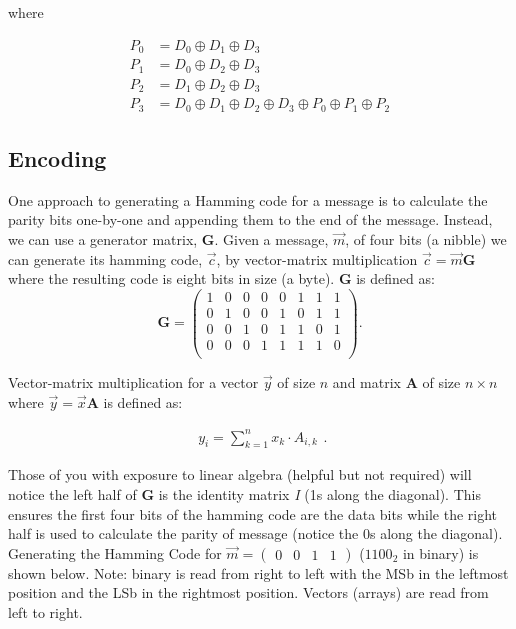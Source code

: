 \documentclass[11pt]{article}
\begin{document}
\noindent where 

\begin{equation*}
\begin{split}
    P_0 &= D_0 \oplus D_1 \oplus D_3 \\
    P_1 &= D_0 \oplus D_2 \oplus D_3 \\
    P_2 &= D_1 \oplus D_2 \oplus D_3 \\
    P_3 &= D_0 \oplus D_1 \oplus D_2 \oplus D_3 \oplus P_0 \oplus P_1 \oplus P_2
\end{split}
\end{equation*}

\subsection{Encoding}
One approach to generating a Hamming code for a message is to calculate the parity bits one-by-one and appending them to the end of the message. Instead, we can
use a generator matrix, $\boldsymbol{G}$.
Given a message, $\Vec{m}$, of four bits (a nibble) we can generate its hamming code, $\Vec{c}$, by vector-matrix
multiplication $\Vec{c} = \Vec{m}\boldsymbol{G}$ where the resulting code is eight bits in size (a byte). 
$\boldsymbol{G}$ is defined as:
\begin{equation*}
  \boldsymbol{G} = 
  \begin{pmatrix}
    1 & 0 & 0 & 0 & 0 & 1 & 1 & 1 \\
    0 & 1 & 0 & 0 & 1 & 0 & 1 & 1 \\
    0 & 0 & 1 & 0 & 1 & 1 & 0 & 1 \\
    0 & 0 & 0 & 1 & 1 & 1 & 1 & 0 \\
  \end{pmatrix}.
\end{equation*}

\noindent Vector-matrix multiplication for a vector $\Vec{y}$ of size $n$ and matrix $\boldsymbol{A}$ of 
size $n \times n$ where $\Vec{y} = \Vec{x}\boldsymbol{A}$ is defined as: 

\begin{equation*}
\begin{split}
    y_{i} = \sum\limits_{k=1}^n x_k \cdot A_{i,k}
\end{split}.
\end{equation*}

Those of you with exposure to linear algebra (helpful but not required) will notice
the left half of $\boldsymbol{G}$ is the identity matrix \textit{I} (1s along the diagonal). 
This ensures the
first four bits of the hamming code are the data bits while the right half is used to
calculate the parity of message (notice the 0s along the diagonal). Generating the 
Hamming Code for $\Vec{m} = \begin{pmatrix} 0 & 0 & 1 & 1 \end{pmatrix}$ ($1100_2$ in binary) is shown below.
Note: binary is read from right to left with the MSb in the leftmost position and the LSb in the rightmost position.
Vectors (arrays) are read from left to right. 
\end{document}
